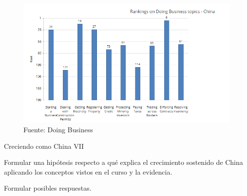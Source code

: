 \documentclass{beamer}
\let\tempone\itemize
\let\temptwo\enditemize
\renewenvironment{itemize}{\tempone\addtolength{\itemsep}{0.5\baselineskip}}{\temptwo}
\begin{document}
	\begin{frame}[plain]
		\begin{figure}
			\centering
			\includegraphics[width=\linewidth, keepaspectratio]{doing_business_rank_components} \\
			{\footnotesize{Fuente: Doing Business}}
		\end{figure}
	\end{frame}

	\begin{frame}{Creciendo como China VII}
		\begin{itemize}
			\item Formular una hipótesis respecto a qué explica el crecimiento sostenido de China aplicando los conceptos vistos en el curso y la evidencia.
			\item Formular posibles respuestas.
		\end{itemize}
	\end{frame}	
\end{document}
